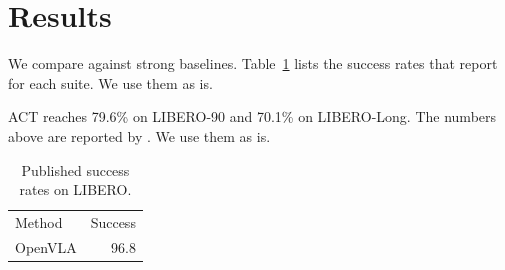 \documentclass{article}
\begin{document}
\section{Results}
We compare against strong baselines. Table~\ref{tab:base} lists the success rates that \citet{kim} report for each suite. We use them as is.

ACT reaches 79.6\% on LIBERO-90 and 70.1\% on LIBERO-Long. The numbers above are reported by \citet{act}. We use them as is.

\begin{table}[t]
\centering
\caption{Published success rates on LIBERO.}
\label{tab:base}
\begin{tabular}{lr}
Method & Success \\
OpenVLA & 96.8 \\
\end{tabular}
\end{table}



\end{document}
